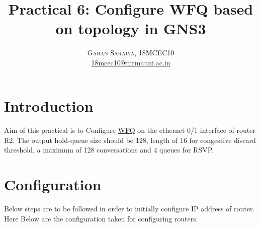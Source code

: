\documentclass[paper=letter, fontsize=12pt]{article}
\title{\vspace{-15mm}\fontsize{24pt}{10pt}\selectfont\textbf{Practical 6: Configure WFQ based on topology in GNS3}} %
\author{
\large
{\textsc{Gahan Saraiya, 18MCEC10 }}\\[2mm]
\normalsize \href{mailto:18mcec10@nirmauni.ac.in}{18mcec10@nirmauni.ac.in}\\[2mm] %
}
\date{}
\begin{document}
\maketitle %
\thispagestyle{fancy} %


\section{Introduction}
\paragraph{} Aim of this practical is to Configure \href{https://www.cisco.com/en/US/docs/ios/12_0t/12_0t5/feature/guide/cbwfq.html}{WFQ} on the ethernet 0/1 interface of router R2. The output hold-queue size should be 128, length of 16 for congestive discard threshold, a maximum of 128 conversations and 4 queues for RSVP.


\section{Configuration}
Below steps are to be followed in order to initially configure IP address of router.
Here Below are the configuration taken for configuring routers.

\end{document}
